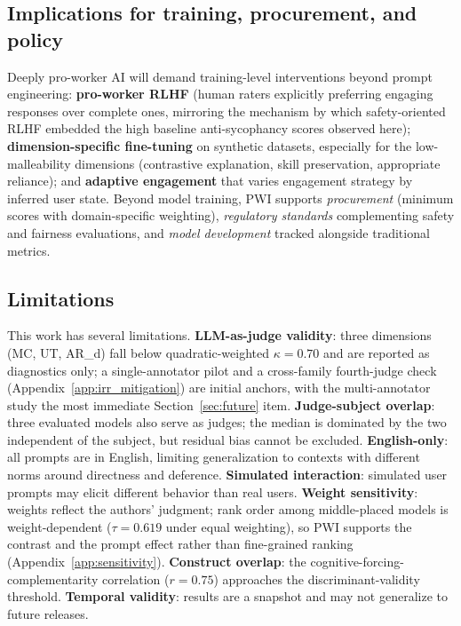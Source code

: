 \documentclass{article}
\begin{document}
\subsection{Implications for training, procurement, and policy}

Deeply pro-worker AI will demand training-level interventions beyond prompt engineering: \textbf{pro-worker RLHF} (human raters explicitly preferring engaging responses over complete ones, mirroring the mechanism by which safety-oriented RLHF embedded the high baseline anti-sycophancy scores observed here); \textbf{dimension-specific fine-tuning} on synthetic datasets, especially for the low-malleability dimensions (contrastive explanation, skill preservation, appropriate reliance); and \textbf{adaptive engagement} \cite{bucinca2024towards} that varies engagement strategy by inferred user state. Beyond model training, PWI supports \textit{procurement} (minimum scores with domain-specific weighting), \textit{regulatory standards} complementing safety and fairness evaluations, and \textit{model development} tracked alongside traditional metrics.

\subsection{Limitations}

This work has several limitations. \textbf{LLM-as-judge validity}: three dimensions (MC, UT, AR\_d) fall below quadratic-weighted $\kappa = 0.70$ and are reported as diagnostics only; a single-annotator pilot and a cross-family fourth-judge check (Appendix~\ref{app:irr_mitigation}) are initial anchors, with the multi-annotator study the most immediate Section~\ref{sec:future} item. \textbf{Judge-subject overlap}: three evaluated models also serve as judges; the median is dominated by the two independent of the subject, but residual bias cannot be excluded. \textbf{English-only}: all prompts are in English, limiting generalization to contexts with different norms around directness and deference. \textbf{Simulated interaction}: simulated user prompts may elicit different behavior than real users. \textbf{Weight sensitivity}: weights reflect the authors' judgment; rank order among middle-placed models is weight-dependent ($\tau = 0.619$ under equal weighting), so PWI supports the contrast and the prompt effect rather than fine-grained ranking (Appendix~\ref{app:sensitivity}). \textbf{Construct overlap}: the cognitive-forcing-complementarity correlation ($r = 0.75$) approaches the discriminant-validity threshold. \textbf{Temporal validity}: results are a snapshot and may not generalize to future releases.
\end{document}
